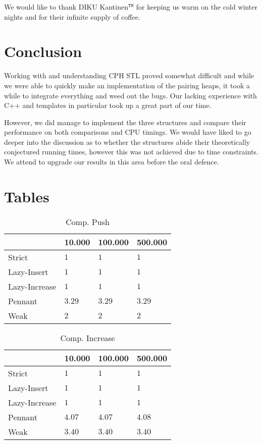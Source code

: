 \documentclass{DIKU-article}[2010/01/13]
\begin{document}
\begin{acknowledgements}
We would like to thank DIKU Kantinen$^{\mathtt{TM}}$ for keeping us
warm on the cold  winter nights and for their infinite supply of coffee.
\end{acknowledgements}


\section{Conclusion}

Working with and understanding CPH STL proved somewhat difficult and
while we were able to quickly make an implementation of the pairing
heaps, it took a while to integrate everything and weed out the
bugs. Our lacking experience with C++ and templates in particular
took up a great part of our time.

However, we did manage to implement the three structures and compare
their performance on both comparisons and CPU timings. We would have
liked to go deeper into the discussion as to whether the structures
abide their theoretically conjectured running times, however this was
not achieved due to time constraints. We attend to upgrade our results
in this area before the oral defence.





\newpage
\appendix


\section{Tables}
\begin{table}[h!]
\centering
\caption{Comp. Push}
\begin{tabular}{l|lll}
\label{tab:comp.first}
 & 10.000 & 100.000 & 500.000 \\
\hline
Strict & $1$ & $1$ & $1$ \\
Lazy-Insert & $1$ & $1$ & $1$ \\
Lazy-Increase & $1$ & $1$ & $1$ \\
Pennant & $3.29$ & $3.29$ & $3.29$ \\
Weak & $2$ & $2$ & $2$

\end{tabular}
\end{table}

\begin{table}[h!]
\centering
\caption{Comp. Increase}
\begin{tabular}{l|lll}
 & 10.000 & 100.000 & 500.000 \\
\hline
Strict & $1$ & $1$ & $1$ \\
Lazy-Insert & $1$ & $1$ & $1$ \\
Lazy-Increase & $1$ & $1$ & $1$ \\
Pennant & $4.07$ & $4.07$ & $4.08$ \\
Weak & $3.40$ & $3.40$ & $3.40$

\end{tabular}
\end{table}
\end{document}

